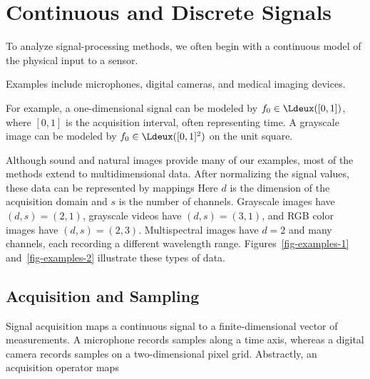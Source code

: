 \section{Continuous and Discrete Signals}

To analyze signal-processing methods, we often begin with a continuous model of the physical input to a sensor.
 
Examples include microphones, digital cameras, and medical imaging devices.
 
For example, a one-dimensional signal can be modeled by $f_0\in\Ldeux([0,1])$, where $[0,1]$ is the acquisition interval, often representing time. A grayscale image can be modeled by $f_0\in\Ldeux([0,1]^2)$ on the unit square.

Although sound and natural images provide many of our examples, most of the methods extend to multidimensional data. After normalizing the signal values, these data can be represented by mappings
Here $d$ is the dimension of the acquisition domain and $s$ is the number of channels. Grayscale images have $(d,s)=(2,1)$, grayscale videos have $(d,s)=(3,1)$, and RGB color images have $(d,s)=(2,3)$. Multispectral images have $d=2$ and many channels, each recording a different wavelength range. Figures~\ref{fig-examples-1} and~\ref{fig-examples-2} illustrate these types of data.





                                           
\subsection{Acquisition and Sampling}

Signal acquisition maps a continuous signal to a finite-dimensional vector of measurements. A microphone records samples along a time axis, whereas a digital camera records samples on a two-dimensional pixel grid. Abstractly, an acquisition operator maps


